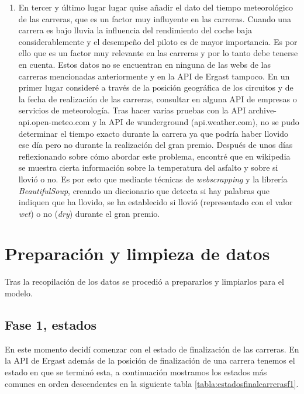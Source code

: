 \begin{enumerate}
    \item En tercer y último lugar lugar quise añadir el dato del tiempo meteorológico de las carreras, que es un factor muy influyente en las carreras. Cuando una carrera es bajo lluvia la influencia del rendimiento del coche baja considerablemente y el desempeño del piloto es de mayor importancia. Es por ello que es un factor muy relevante en las carreras y por lo tanto debe tenerse en cuenta.
    Estos datos no se encuentran en ninguna de las webs de las carreras mencionadas anteriormente y en la API de Ergast tampoco. En un primer lugar consideré a través de la posición geográfica de los circuitos y de la fecha de realización de las carreras, consultar en alguna API de empresas o servicios de meteorología. Tras hacer varias pruebas con la API archive-api.open-meteo.com y la API de wunderground (api.weather.com), no se pudo determinar el tiempo exacto durante la carrera ya que podría haber llovido ese día pero no durante la realización del gran premio. 
    Después de unos días reflexionando sobre cómo abordar este problema, encontré que en wikipedia se muestra cierta información sobre la temperatura del asfalto y sobre si llovió o no. Es por esto que mediante técnicas de \textit{webscrapping} y la librería \textit{BeautifulSoup}, creando un diccionario que detecta si hay palabras que indiquen que ha llovido, se ha establecido si llovió (representado con el valor \textit{wet}) o no (\textit{dry}) durante el gran premio.
\end{enumerate}

\section{Preparación y limpieza de datos}

Tras la recopilación de los datos se procedió a prepararlos y limpiarlos para el modelo. 

\subsection{Fase 1, estados}

En este momento decidí comenzar con el estado de finalización de las carreras. En la API de Ergast además de la posición de finalización de una carrera tenemos el estado en que se terminó esta, a continuación mostramos los estados más comunes en orden descendentes en la siguiente tabla \ref{tabla:estadosfinalcarrerasf1}.

